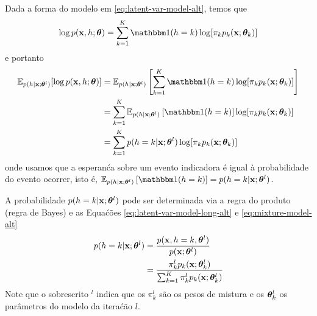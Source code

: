 \begin{exenumerate}
\begin{solution}
        Dada a forma do modelo em \eqref{eq:latent-var-model-alt}, temos que
        \begin{align}
            \log p(\x, h; \thetab) = \sum_{k=1}^K \ind(h=k) \log[  \pi_k  p_k(\x; \thetab_k) ]
        \end{align}
        e portanto
        \begin{align}
            \E_{p(h| \x; \thetab^l)}[ \log p(\x, h; \thetab)] &=  \E_{p(h| \x; \thetab^l)}\left[ \sum_{k=1}^K \ind(h=k) \log[  \pi_k  p_k(\x; \thetab_k) ] \right]\\
            &=  \sum_{k=1}^K  \E_{p(h| \x; \thetab^l)}\left[ \ind(h=k) \right] \log[  \pi_k  p_k(\x; \thetab_k) ]\\
            & = \sum_{k=1}^K p(h=k|\x; \thetab^l)  \log[  \pi_k  p_k(\x; \thetab_k) ]
        \end{align}
        onde usamos que a esperan\'ca sobre um evento indicadora \'e igual \`a
        probabilidade do evento ocorrer, isto \'e, $\E_{p(h| \x; \thetab^l)}\left[
        \ind(h=k) \right] =  p(h=k|\x; \thetab^l)$.
        
        A probabilidade $p(h=k|\mathbf{x}; \boldsymbol{\theta}^l)$ pode ser determinada via a regra do produto
        (regra de Bayes) e as Equa\'c\~oes \eqref{eq:latent-var-model-long-alt} e \eqref{eq:mixture-model-alt}
        \begin{align}
            p(h=k|\mathbf{x}; \boldsymbol{\theta}^l) &= \frac{p(\mathbf{x}, h=k, \boldsymbol{\theta}^l)}{p(\mathbf{x}; \boldsymbol{\theta}^l)}\\
            & = \frac{ \pi^l_k p_k(\mathbf{x}; \boldsymbol{\theta}^l_k)}{ \sum_{k=1}^K \pi^l_k p_k(\mathbf{x}; \boldsymbol{\theta}^l_k)}
            \label{eq:posterior-def-alt}
        \end{align}
        Note que o sobrescrito $^l$ indica que os $\pi_k^l$ s\~ao os pesos de mistura
        e os $\boldsymbol{\theta}^l_k$ os par\^ametros do modelo da itera\'c\~ao $l$.
        

\end{solution}
\end{exenumerate}
